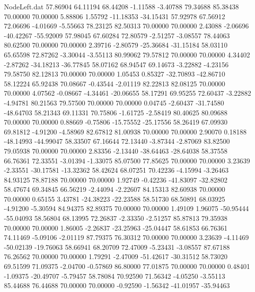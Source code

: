 \begin{filecontents}{NodeLeft.dat}
  57.86904   64.11194   68.44208    -1.11588   -3.40788   79.34688   85.38438   70.00000   70.00000    5.88806    1.55792  -11.18353  -34.15431
  57.92978   67.56912   72.06696    -4.01669   -5.55663   78.23125   82.50313   70.00000   70.00000    2.43088   -2.06696  -40.42267  -55.92009
  57.98045   67.60284   72.80579    -2.51257   -3.08557   78.44063   80.62500   70.00000   70.00000    2.39716   -2.80579  -25.36684  -31.15184
  58.03110   65.65598   72.87262    -3.30044   -3.55113   80.99062   79.57812   70.00000   70.00000    4.34402   -2.87262  -34.18213  -36.77845
  58.07162   68.94547   69.14673    -3.22882   -4.23156   79.58750   82.12813   70.00000   70.00000    1.05453    0.85327  -32.70893  -42.86710
  58.12224   65.92438   70.08667    -0.43544   -2.01119   82.22813   82.08125   70.00000   70.00000    4.07562   -0.08667   -4.34461  -20.06655
  58.17291   69.95255   72.60437    -3.22882   -4.94781   80.21563   79.57500   70.00000   70.00000    0.04745   -2.60437  -31.74580  -48.64703
  58.21343   69.11331   70.75806    -1.61725   -2.58419   80.40625   80.09688   70.00000   70.00000    0.88669   -0.75806  -15.75552  -25.17556
  58.26419   67.09930   69.81812    -4.91200   -4.58969   82.67812   81.00938   70.00000   70.00000    2.90070    0.18188  -48.14993  -44.99047
  58.33507   67.16644   72.13440    -3.87344   -2.87069   83.82500   79.05938   70.00000   70.00000    2.83356   -2.13440  -38.64463  -28.64038
  58.37558   66.76361   72.33551    -3.01394   -1.33075   85.07500   77.85625   70.00000   70.00000    3.23639   -2.33551  -30.17581  -13.32362
  58.42624   68.07251   70.42236    -4.15994   -3.26463   84.93125   78.87188   70.00000   70.00000    1.92749   -0.42236  -41.83097  -32.82802
  58.47674   69.34845   66.56219    -2.44094   -2.22607   84.15313   82.60938   70.00000   70.00000    0.65155    3.43781  -24.38223  -22.23588
  58.51730   68.50891   68.03925    -4.91200   -5.30594   84.94375   82.89375   70.00000   70.00000    1.49109    1.96075  -50.95444  -55.04093
  58.56804   68.13995   72.26837    -2.33350   -2.51257   85.87813   79.35938   70.00000   70.00000    1.86005   -2.26837  -23.25963  -25.04447
  58.61853   66.76361   74.11469    -5.09106   -2.01119   87.79375   76.30312   70.00000   70.00000    3.23639   -4.11469  -50.02139  -19.76063
  58.66941   68.20709   72.47009    -5.23431   -3.08557   87.67188   76.26562   70.00000   70.00000    1.79291   -2.47009  -51.42617  -30.31512
  58.73020   69.51599   71.09375    -2.04700   -0.57869   86.80000   77.01875   70.00000   70.00000    0.48401   -1.09375  -20.49707   -5.79457
  58.78084   70.92590   71.56342    -4.05250   -3.55113   85.44688   76.44688   70.00000   70.00000   -0.92590   -1.56342  -41.01957  -35.94463

\end{filecontents}
